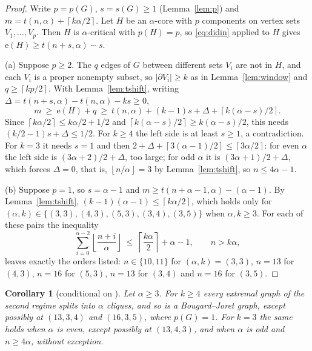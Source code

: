 \documentclass[11pt]{article}
\newtheorem{corollary}[theorem]{Corollary}
\theoremstyle{definition}
\theoremstyle{remark}
\newcommand{\e}{\mathrm{e}}
\newcommand{\ceil}[1]{\left\lceil #1\right\rceil}
\newcommand{\floor}[1]{\left\lfloor #1\right\rfloor}
\begin{document}
\begin{proof}
Write $p=p(G)$, $s=s(G)\ge1$ (Lemma~\ref{lem:p}) and $m=t(n,\alpha)+\ceil{k\alpha/2}$. Let $H$ be an $\alpha$-core
with $p$ components on vertex sets $V_1,\dots,V_p$. Then $H$ is $\alpha$-critical with $p(H)=p$, so
\eqref{eq:didin} applied to $H$ gives $\e(H)\ge t(n+s,\alpha)-s$.

(a) Suppose $p\ge2$. The $q$ edges of $G$ between different sets $V_i$ are not in $H$, and each $V_i$ is a proper
nonempty subset, so $|\partial V_i|\ge k$ as in Lemma~\ref{lem:window} and $q\ge\ceil{kp/2}$. With
Lemma~\ref{lem:tshift}, writing $\Delta=t(n+s,\alpha)-t(n,\alpha)-ks\ge0$,
\[
m\ \ge\ \e(H)+q\ \ge\ t(n,\alpha)+(k-1)s+\Delta+\ceil{k(\alpha-s)/2}.
\]
Since $\ceil{k\alpha/2}\le k\alpha/2+1/2$ and $\ceil{k(\alpha-s)/2}\ge k(\alpha-s)/2$, this needs
$(k/2-1)s+\Delta\le1/2$. For $k\ge4$ the left side is at least $s\ge1$, a contradiction. For $k=3$ it needs $s=1$ and
then $2+\Delta+\ceil{3(\alpha-1)/2}\le\ceil{3\alpha/2}$: for even $\alpha$ the left side is $(3\alpha+2)/2+\Delta$,
too large; for odd $\alpha$ it is $(3\alpha+1)/2+\Delta$, which forces $\Delta=0$, that is, $\floor{n/\alpha}=3$ by
Lemma~\ref{lem:tshift}, so $n\le4\alpha-1$.

(b) Suppose $p=1$, so $s=\alpha-1$ and $m\ge t(n+\alpha-1,\alpha)-(\alpha-1)$. By Lemma~\ref{lem:tshift},
$(k-1)(\alpha-1)\le\ceil{k\alpha/2}$, which holds only for $(\alpha,k)\in\{(3,3),(4,3),(5,3),(3,4),(3,5)\}$ when
$\alpha,k\ge3$. For each of these pairs the inequality
\begin{equation}\label{eq:pone}
\sum_{i=0}^{\alpha-2}\floor{\frac{n+i}{\alpha}}\ \le\ \ceil{\frac{k\alpha}{2}}+\alpha-1,\qquad n>k\alpha,
\end{equation}
leaves exactly the orders listed: $n\in\{10,11\}$ for $(\alpha,k)=(3,3)$, $n=13$ for $(4,3)$, $n=16$ for $(5,3)$,
$n=13$ for $(3,4)$ and $n=16$ for $(3,5)$.
\end{proof}

\begin{corollary}[conditional on {\cite[Theorem~3]{Didin}}]\label{cor:where}
Let $\alpha\ge3$. For $k\ge4$ every extremal graph of the second regime splits into $\alpha$ cliques, and so is a Bougard--Joret graph,
except possibly at $(13,3,4)$ and $(16,3,5)$, where $p(G)=1$. For $k=3$ the same holds when $\alpha$ is even, except
possibly at $(13,4,3)$, and when $\alpha$ is odd and $n\ge4\alpha$, without exception.
\end{corollary}
\end{document}
